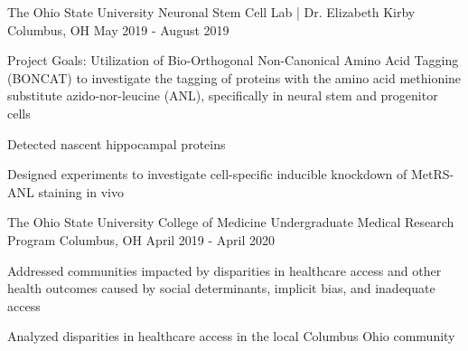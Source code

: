 

\begin{cventries}

  \cventry
    {The Ohio State University} %
    {Neuronal Stem Cell Lab | Dr. Elizabeth Kirby} %
    {Columbus, OH} %
    {May 2019 - August 2019} %
    {
      \begin{cvitems} %
        \item {Project Goals: Utilization of Bio-Orthogonal Non-Canonical Amino Acid Tagging (BONCAT) to investigate the tagging of proteins with the amino acid methionine substitute azido-nor-leucine (ANL), specifically in neural stem and progenitor cells}
        \item {Detected nascent hippocampal proteins}
        \item {Designed experiments to investigate cell-specific inducible knockdown of MetRS-ANL staining in vivo}
      \end{cvitems}
    }

  \cventry
    {The Ohio State University College of Medicine} %
    {Undergraduate Medical Research Program} %
    {Columbus, OH} %
    {April 2019 - April 2020} %
    {
      \begin{cvitems} %
        \item {Addressed communities impacted by disparities in healthcare access and other health outcomes
 caused by social determinants, implicit bias, and inadequate access}
        \item {Analyzed disparities in healthcare access in the local Columbus Ohio community}
      \end{cvitems}
    }

 
 









\end{cventries}
